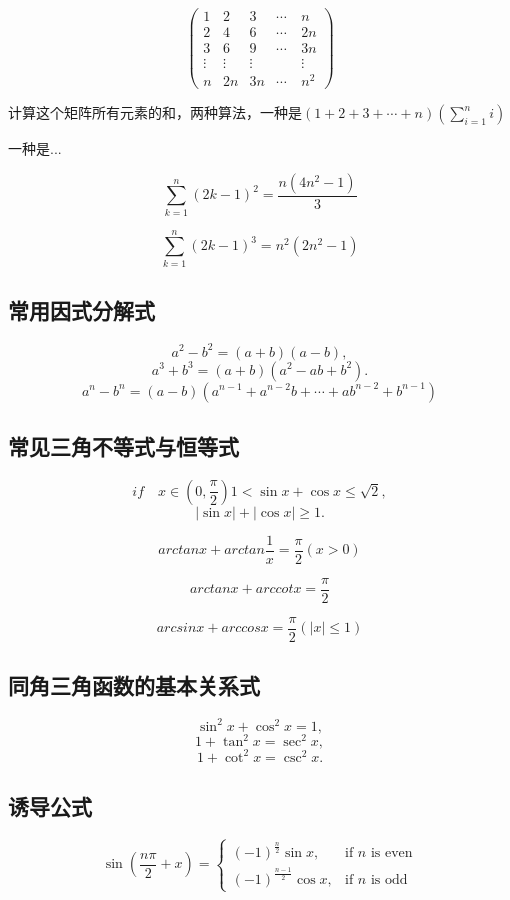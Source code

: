 \documentclass{article}
\numberwithin{equation}{section}
\begin{document}
\[
\begin{pmatrix}
1 & 2 & 3 & \cdots & n\\
2 & 4 & 6 & \cdots & 2n\\
3 & 6 & 9 &\cdots & 3n\\
\vdots & \vdots & \vdots & \quad & \vdots \\
n & 2n & 3n & \cdots & n^2
\end{pmatrix}
\]

计算这个矩阵所有元素的和，两种算法，一种是\( (1 + 2+3 + \cdots +n) \left( \sum_{i=1}^n i \right) \)

一种是...

\[
\sum_{k=1}^n (2k-1)^2  = \dfrac{n(4n^2-1)}{3}
\]

\[
\sum_{k=1}^n (2k-1)^3 = n^2(2n^2-1)
\]

\subsection{常用因式分解式}
\[
a^2 - b^2 = (a+b)(a-b),
\]
\[
a^3 + b^3 = (a+b)(a^2-ab+b^2).
\]
\[
a^n - b^n = (a-b)(a^{n-1}+a^{n-2}b+\cdots+ab^{n-2}+b^{n-1})
\]

\subsection{常见三角不等式与恒等式}
\[
if \quad x \in (0, \frac{\pi}{2})1 < \sin x + \cos x \leq \sqrt{2},
\]
\[
|\sin x| + |\cos x| \geq 1.
\]

\[
arctanx + arctan \frac{1}{x} = \frac{\pi}{2} (x > 0)
\]

\[
arctanx + arccot x = \frac{\pi}{2}
\]

\[
arcsinx + arccosx = \frac{\pi}{2} (|x| \leq 1)
\]

\subsection{同角三角函数的基本关系式}
\[
\sin^2 x + \cos^2 x = 1,
\]
\[
1 + \tan^2 x = \sec^2 x,
\]
\[
1 + \cot^2 x = \csc^2 x.
\]

\subsection{诱导公式}


\[
 \sin(\frac{n \pi}{2} + x)=
\begin{cases} 
(-1)^{\frac{n}{2}}   \sin x,  & \mbox{if }n \mbox{ is even} \\
(-1)^{\frac{n-1}{2}} \cos x, & \mbox{if }n \mbox{ is odd}
\end{cases}
\]
\end{document}
